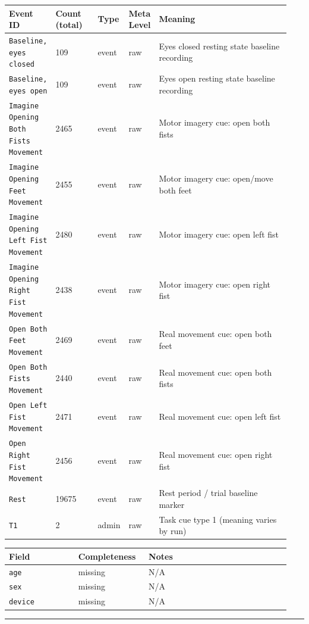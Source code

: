 {\begin{tcolorbox}
\begin{tabular}{@{}p{0.1567\linewidth}p{0.1567\linewidth}p{0.0783\linewidth}p{0.0783\linewidth}p{0.4700\linewidth}@{}}
\toprule
\textbf{Event ID} & \textbf{Count (total)} & \textbf{Type} & \textbf{Meta Level} & \textbf{Meaning} \\
\midrule
\texttt{Baseline, eyes closed} & 109 & event & raw & Eyes closed resting state baseline recording \\
\texttt{Baseline, eyes open} & 109 & event & raw & Eyes open resting state baseline recording \\
\texttt{Imagine Opening Both Fists Movement} & 2465 & event & raw & Motor imagery cue: open both fists \\
\texttt{Imagine Opening Feet Movement} & 2455 & event & raw & Motor imagery cue: open/move both feet \\
\texttt{Imagine Opening Left Fist Movement} & 2480 & event & raw & Motor imagery cue: open left fist \\
\texttt{Imagine Opening Right Fist Movement} & 2438 & event & raw & Motor imagery cue: open right fist \\
\texttt{Open Both Feet Movement} & 2469 & event & raw & Real movement cue: open both feet \\
\texttt{Open Both Fists Movement} & 2440 & event & raw & Real movement cue: open both fists \\
\texttt{Open Left Fist Movement} & 2471 & event & raw & Real movement cue: open left fist \\
\texttt{Open Right Fist Movement} & 2456 & event & raw & Real movement cue: open right fist \\
\texttt{Rest} & 19675 & event & raw & Rest period / trial baseline marker \\
\texttt{T1} & 2 & admin & raw & Task cue type 1 (meaning varies by run) \\
\bottomrule
\end{tabular}
\endgroup
\smallskip{}\par\smallskip
\begingroup\scriptsize\setlength{\tabcolsep}{2pt}
\begin{tabular}{@{}p{0.2350\linewidth}p{0.2350\linewidth}p{0.4700\linewidth}@{}}
\toprule
\textbf{Field} & \textbf{Completeness} & \textbf{Notes} \\
\midrule
\texttt{age} & missing & N/A \\
\texttt{sex} & missing & N/A \\
\texttt{device} & missing & N/A \\
\bottomrule
\end{tabular}
\endgroup
\noindent\rule{\linewidth}{0.7pt}\par\nopagebreak

\end{tcolorbox}}
